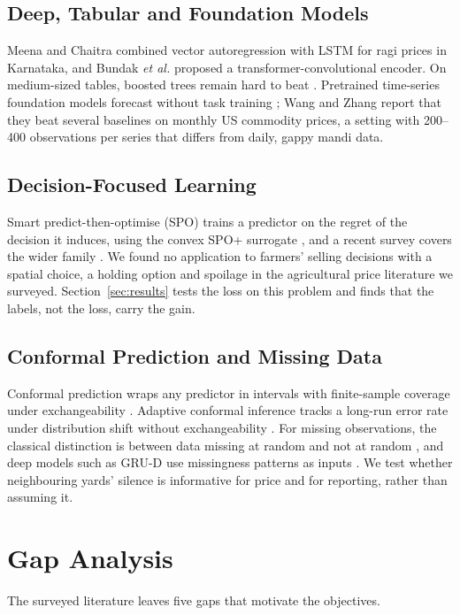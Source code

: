 \documentclass{ieeeaccess}
\begin{document}
\subsection{Deep, Tabular and Foundation Models}
Meena and Chaitra \cite{meena2024} combined vector autoregression with LSTM for ragi prices in Karnataka, and Bundak \emph{et al.} \cite{bundak2025} proposed a transformer-convolutional encoder. On medium-sized tables, boosted trees \cite{chen2016,ke2017} remain hard to beat \cite{grinsztajn2022}. Pretrained time-series foundation models forecast without task training \cite{ansari2024}; Wang and Zhang \cite{wang2026} report that they beat several baselines on monthly US commodity prices, a setting with 200--400 observations per series that differs from daily, gappy mandi data.

\subsection{Decision-Focused Learning}
Smart predict-then-optimise (SPO) trains a predictor on the regret of the decision it induces, using the convex SPO+ surrogate \cite{elmachtoub2022}, and a recent survey covers the wider family \cite{mandi2024}. We found no application to farmers' selling decisions with a spatial choice, a holding option and spoilage in the agricultural price literature we surveyed. Section~\ref{sec:results} tests the loss on this problem and finds that the labels, not the loss, carry the gain.

\subsection{Conformal Prediction and Missing Data}
Conformal prediction wraps any predictor in intervals with finite-sample coverage under exchangeability \cite{vovk2005,angelopoulos2023,romano2019}. Adaptive conformal inference tracks a long-run error rate under distribution shift without exchangeability \cite{gibbs2021}. For missing observations, the classical distinction is between data missing at random and not at random \cite{rubin1976}, and deep models such as GRU-D use missingness patterns as inputs \cite{che2018}. We test whether neighbouring yards' silence is informative for price and for reporting, rather than assuming it.

\section{Gap Analysis}
\label{sec:gap}
The surveyed literature leaves five gaps that motivate the objectives.
\end{document}
